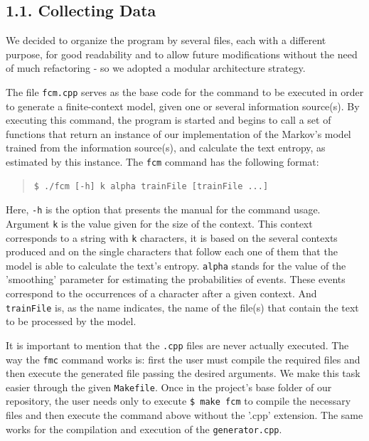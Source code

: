 \documentclass[12pt]{article}
\begin{document}
\subsection*{1.1. Collecting Data}

We decided to organize the program by several files, each with a different
purpose, for good readability and to allow future modifications without the 
need of much refactoring - so we adopted a modular architecture strategy.

The file \texttt{fcm.cpp} serves as the base code for the command to be executed in order to 
generate a finite-context model, given one or several information source(s).
By executing this command, the program is started and begins to
call a set of functions that return an instance of our 
implementation of the Markov's model trained from the information source(s), 
and calculate the text entropy, as estimated by this instance.
The \texttt{fcm} command has the following format:

\begin{quote}
\begin{verbatim}
$ ./fcm [-h] k alpha trainFile [trainFile ...]
\end{verbatim}
\end{quote}

Here, \texttt{-h} is the option that presents the manual for the command usage.
Argument \texttt{k} is the value given for the size of the context.
This context corresponds to a string with \texttt{k} characters, it is based on
the several contexts produced and on the single characters that follow each one
of them that the model is able to calculate the text's entropy.
\texttt{alpha} stands for the value of the 'smoothing' parameter for estimating
the probabilities of events. 
These events correspond to the occurrences of a character after a given context.
And \texttt{trainFile} is, as the name indicates, the name of the file(s) that
contain the text to be processed by the model.

It is important to mention that the \texttt{.cpp} files are never actually
executed. The way the \texttt{fmc} command works is: first the user must 
compile the required files and then execute the generated file passing the 
desired arguments.
We make this task easier through the given \texttt{Makefile}.
Once in the project's base folder of our repository, the user needs only to
execute \texttt{\$ make fcm} to compile the necessary files and then 
execute the command above without the '.cpp' extension.
The same works for the compilation and execution of the \texttt{generator.cpp}.
\end{document}
